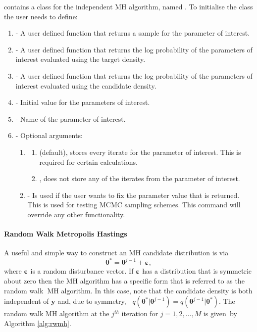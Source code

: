 \documentclass[article]{jss}
\begin{document}
 contains a class for the independent MH algorithm, named
.  To initialise the class the user needs to define:
\begin{enumerate}
\item {} - A user defined function that returns a sample for
  the parameter of interest.
\item {} - A user defined function that returns the log
  probability of the parameters of interest evaluated using the target
  density.
\item {} - A user defined function that returns the log
  probability of the parameters of interest evaluated using the
  candidate density.
\item {} - Initial value for the parameters of interest.
\item {} - Name of the parameter of interest.
\item {}- Optional arguments:

\begin{enumerate}
\item {}
  \begin{enumerate}
  \item {} (default), stores every iterate for the parameter
    of interest. This is required for certain calculations.
  \item {}, does not store any of the iterates from the parameter
    of interest.
  \end{enumerate}
\item {} - Is used if the user wants to fix the
    parameter value that is returned. This is used for testing MCMC
    sampling schemes.  This command will override any other
    functionality.
  \end{enumerate}
\end{enumerate}

\paragraph{Random Walk Metropolis Hastings \protect \protect \\
}

A useful and simple way to construct an MH candidate distribution is
via\begin{equation}
  \bm{\theta}^{\ast}=\bm{\theta}^{j-1}+\bm{\bm{\varepsilon}},\label{random
    walk candidate}\end{equation} where $\bm{\varepsilon}$ is a random
disturbance vector. If $\bm{\varepsilon}$ has a distribution that is
symmetric about zero then the MH algorithm has a specific form that is
referred to as the random walk\textbf{\ }MH algorithm. In this case,
note that the candidate density is both independent of $\bm{y}$ and,
due to symmetry, \textbf{\
}$q\left(\bm{\theta}^{\ast}|\bm{\theta}^{j-1}\right)=q\left(\bm{\theta}^{j-1}|\bm{\theta}^{\ast}\right)$.
The random walk MH algorithm at the $j^{th}$ iteration for
$j=1,2,\ldots,M$ is given\emph{\ }by Algorithm \ref{alg:rwmh}.
\end{document}
